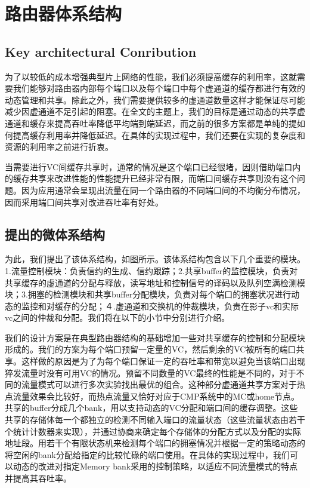 ﻿\documentclass[10pt,journal]{IEEEtran}
\begin{document}
\section{路由器体系结构}\label{implemented}
\subsection{Key architectural Conribution}
为了以较低的成本增强典型片上网络的性能，我们必须提高缓存的利用率，这就需要我们能够对路由器内部每个端口以及每个端口中每个虚通道的缓存都进行有效的动态管理和共享。除此之外，我们需要提供较多的虚通道数量这样才能保证尽可能减少因虚通道不足引起的阻塞。在全文的主题上，我们的目标是通过动态的共享虚通道和缓存来提高吞吐率降低平均端到端延迟，而之前的很多方案都是单纯的提如何提高缓存利用率并降低延迟。在具体的实现过程中，我们还要在实现的复杂度和资源的利用率之前进行折衷。

当需要进行VC间缓存共享时，通常的情况是这个端口已经很堵，因则借助端口内的缓存共享来改进性能的性能提升已经非常有限，而端口间缓存共享则没有这个问题。因为应用通常会呈现出流量在同一个路由器的不同端口间的不均衡分布情况，因而采用端口间共享对改进吞吐率有好处。

\subsection{提出的微体系结构}
为此，我们提出了该体系结构，如图所示。该体系结构包含以下几个重要的模块。1.流量控制模块：负责信约的生成、信约跟踪；2.共享buffer的监控模块，负责对共享缓存的虚通道的分配与释放，读写地址和控制信号的译码以及队列空满检测模块；3.拥塞的检测模块和共享buffer分配模块，负责对每个端口的拥塞状况进行动态的监控和对缓存的分配；４.虚通道和交换机的仲裁模块，负责在影子vc和实际vc之间的仲裁和分配。我们将在以下的小节中分别进行介绍。

我们的设计方案是在典型路由器结构的基础增加一些对共享缓存的控制和分配模块形成的。我们的方案为每个端口预留一定量的VC，然后剩余的VC被所有的端口共享。这样做的原因是为了为每个端口保证一定的吞吐率和带宽以避免当该端口出现猝发流量时没有可用VC的情况。预留不同数量的VC最终的性能是不同的，对于不同的流量模式可以进行多次实验找出最优的组合。这种部分虚通道共享方案对于热点流量效果会比较好，而热点流量又恰好对应于CMP系统中的MC或home节点。共享的buffer分成几个bank，用以支持动态的VC分配和端口间的缓存调整。这些共享的存储体每一个都独立的检测不同输入端口的流量状态（这些流量状态由若干个统计计数器来实现），并通过协商来确定每个存储体的分配方式以及分配的实际地址段。用若干个有限状态机来检测每个端口的拥塞情况并根据一定的策略动态的将空闲的bank分配给指定的比较忙碌的端口使用。在具体的实现过程中，我们可以动态的改进对指定Memory bank采用的控制策略，以适应不同流量模式的特点并提高其吞吐率。
\end{document}
